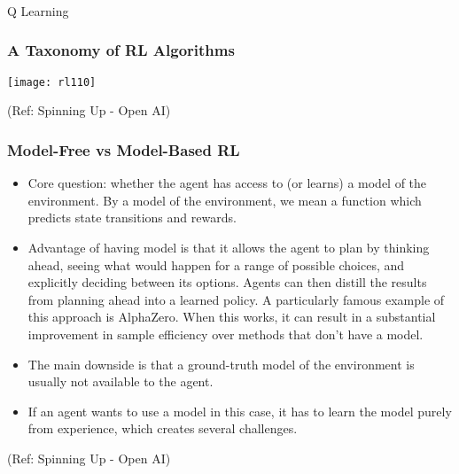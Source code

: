 \begin{frame}[fragile]\frametitle{}
\begin{center}
{\Large Q Learning}
\end{center}
\end{frame}

\begin{frame}[fragile]\frametitle{A Taxonomy of RL Algorithms}

\begin{center}
\texttt{[image: rl110]}
\end{center}

{\tiny (Ref: Spinning Up - Open AI)}
\end{frame}

\begin{frame}[fragile]\frametitle{Model-Free vs Model-Based RL}

\begin{itemize}
\item Core question: whether the agent has access to (or learns) a model of the environment. By a model of the environment, we mean a function which predicts state transitions and rewards.
\item Advantage of having model is that it allows the agent to plan by thinking ahead, seeing what would happen for a range of possible choices, and explicitly deciding between its options. Agents can then distill the results from planning ahead into a learned policy. A particularly famous example of this approach is AlphaZero. When this works, it can result in a substantial improvement in sample efficiency over methods that don’t have a model.
\item The main downside is that a ground-truth model of the environment is usually not available to the agent. 
\item If an agent wants to use a model in this case, it has to learn the model purely from experience, which creates several challenges. 

\end{itemize}

{\tiny (Ref: Spinning Up - Open AI)}
\end{frame}

